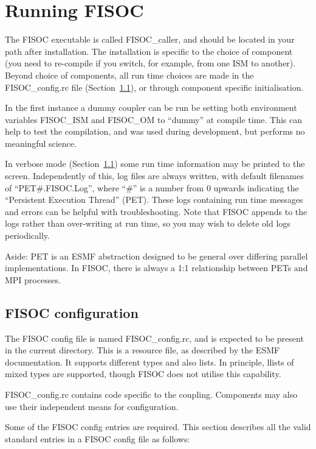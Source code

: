 \documentclass[12pt]{article}
\begin{document}
\section{Running FISOC}
\label{sec:FISOC_SUG}

The FISOC executable is called FISOC\_caller, and should be located in your path after installation. 
The installation is specific to the choice of component (you need to re-compile if you switch, for 
example, from one ISM to another).  
Beyond choice of components, all run time choices are made in the FISOC\_config.rc file
(Section~\ref{sec:config}), 
or through component specific initialisation.

In the first instance a dummy coupler can be run be setting both environment variables FISOC\_ISM and 
FISOC\_OM to ``dummy'' at compile time.  This can help to test the compilation, and was used during development, 
but performs no meaningful science.  

In verbose mode (Section~\ref{sec:config}) some run time information may be printed to the screen.  
Independently of this, log files are always written, 
with default filenames of ``PET\#.FISOC.Log'', where ``\#'' is a number from 0 upwards indicating the 
``Persistent Execution Thread'' (PET). 
These logs containing run time messages and errors can be helpful with troubleshooting.
Note that FISOC appends to the logs rather than over-writing at run time, so you may wish to delete old logs 
periodically. 

Aside: PET is an ESMF abstraction designed to be general over differing parallel implementations. 
In FISOC, there is always a 1:1 relationship between PETs and MPI processes. 


\subsection{FISOC configuration}
\label{sec:config}

The FISOC config file is named FISOC\_config.rc, and is expected to be present 
in the current directory.  
This is a resource file, as described by the 
ESMF documentation.  It supports different types and also lists. 
In principle, llists of mixed types are supported, though FISOC does not utilise this capability.

FISOC\_config.rc contains code specific to the coupling.  Components may also use their 
independent means for configuration.

Some of the FISOC config entries are required.
This section describes all the valid standard entries in a FISOC config file as follows:
\end{document}
